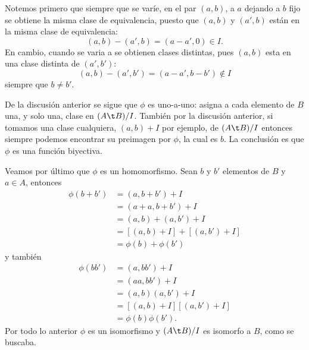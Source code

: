 \begin{sol}
\begin{enumerate}
		Notemos primero que siempre que se varíe, en el par $(a,b)$, a $a$ dejando a $b$ fijo se obtiene la misma clase de equivalencia, puesto que $(a,b)$ y $(a',b)$ están en la misma clase de equivalencia:
		\[ (a,b) - (a',b) = (a-a',0)\in I. \]
		En cambio, cuando se varia a se obtienen clases distintas, pues $(a,b)$ esta en una clase distinta de $(a',b')$:
		\[ (a,b) - (a',b') = (a-a',b-b') \notin I \]
		siempre que $b\neq b'$.
		
		De la discusión anterior se sigue que $\phi$ es uno-a-uno: asigna a cada elemento de $B$ una, y solo una, clase en $(A\t B)/I$. También por la discusión anterior, si tomamos una clase cualquiera, $(a,b) + I$ por ejemplo, de $(A\t B)/I$ entonces siempre podemos encontrar su preimagen por $\phi$, la cual es $b$. La conclusión es que $\phi$ es una función biyectiva.
		
		Veamos por último que $\phi$ es un homomorfismo. Sean $b$ y $b'$ elementos de $B$ y $a\in A$, entonces
		\begin{align*}
			\phi(b+b') &= (a,b+b') + I \\
					   &= (a+a,b+b') + I \\
					   &= (a,b) + (a,b') + I \\
					   &= [(a,b) + I] + [(a,b') + I] \\
					   &= \phi(b) + \phi(b')
		\end{align*}
		y también
		\begin{align*}
			\phi(bb') &= (a,bb') + I \\
					  &= (aa,bb') + I \\
					  &= (a,b)(a,b') + I \\
					  &= [(a,b) + I][(a,b') + I] \\
					  &= \phi(b)\phi(b').
		\end{align*}
		Por todo lo anterior $\phi$ es un isomorfismo y $(A\t B)/I$ es isomorfo a $B$, como se buscaba.
	\end{enumerate}
\end{sol}
